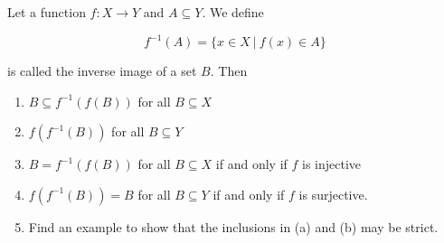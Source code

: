 Let a function $f: X \rightarrow Y$ and $A \subseteq Y$. We define

$$f^{-1}(A) = \{x \in X ~|~ f(x) \in A\}$$

is called the inverse image of a set $B$. Then

\begin{enumerate}
	\item $B \subseteq f^{-1}(f(B))$ for all $B \subseteq X$
	\item $f(f^{-1}(B))$ for all $B \subseteq Y$
	\item $B = f^{-1}(f(B))$ for all $B \subseteq X$ if and only if $f$ is injective
	\item $f(f^{-1}(B)) = B$ for all $B \subseteq Y$ if and only if $f$ is surjective.
	\item Find an example to show that the inclusions in (a) and (b) may be strict.
\end{enumerate}


